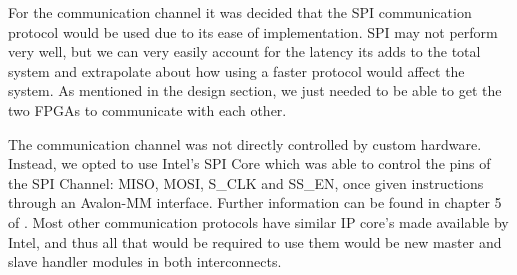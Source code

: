 For the communication channel it was decided that the SPI communication protocol would be used due to its ease of implementation. SPI may not perform very well, but we can very easily account for the latency its adds to the total system and extrapolate about how using a faster protocol would affect the system. As mentioned in the design section, we just needed to be able to get the two FPGAs to communicate with each other.

The communication channel was not directly controlled by custom hardware. Instead, we opted to use Intel's SPI Core which was able to control the pins of the SPI Channel: MISO, MOSI, S\_CLK and SS\_EN, once given instructions through an Avalon-MM interface. Further information can be found in chapter 5 of \cite{intel-embedded-periph}. Most other communication protocols have similar IP core's made available by Intel, and thus all that would be required to use them would be new master and slave handler modules in both interconnects.